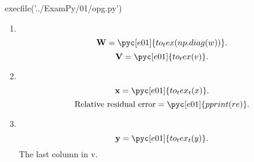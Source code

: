 \documentclass[../main.tex]{subfiles}
\begin{document}
\begin{pycode}[e01]
execfile('../ExamPy/01/opg.py')
\end{pycode}

\begin{enumerate}
	\item \\
		\[
			\textbf{W}= \pyc[e01]{to_tex(np.diag(w))}
		.\] 
		\[
			\textbf{V}=\pyc[e01]{to_tex(v)}
		.\] 
	\item \\
		\[
			\textbf{x} = \pyc[e01]{to_tex_t(x)}
		.\] 
		\[
			\textrm{Relative residual error}=\pyc[e01]{pprint(re)}
		.\] 
	\item \\
		\[
			\textbf{y}=\pyc[e01]{to_tex_t(y)}
		.\] 
		The last column in v.
\end{enumerate}

\inputminted{python}{../ExamPy/01/opg.py}

	
\end{document}
